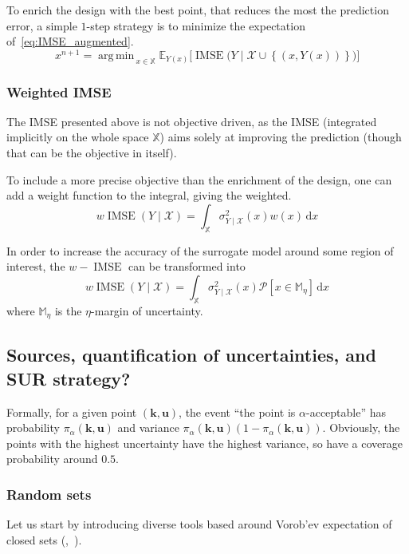 \documentclass[a4paper,11pt]{article}
\newcommand{\Ex}{\mathbb{E}}
\newcommand{\ProbGP}{\mathcal{P}}
\newcommand{\Xspace}{\mathbb{X}}
\newcommand{\kk}{\mathbf{k}}
\newcommand{\uu}{\mathbf{u}}
\DeclareMathOperator*{\argmin}{arg\,min \,}
\DeclareMathOperator{\IMSE}{IMSE}
\theoremstyle{defi}
\numberwithin{thmCounter}{section}
\begin{document}
To enrich the design with the best point, that reduces the most the prediction error, a simple $1$-step strategy is to minimize the expectation of~\eqref{eq:IMSE_augmented}.
\begin{equation}
  x^{n+1} = \argmin_{x\in \Xspace}\Ex_{Y(x)}\Big[\IMSE\big(Y \mid \mathcal{X} \cup \left\{(x, Y(x))\right\} \big)\Big]
\end{equation}

\subsubsection{Weighted IMSE}
The IMSE presented above is not objective driven, as the IMSE (integrated implicitly on the whole space $\Xspace$) aims solely at improving the prediction (though that can be the objective in itself).

To include a more precise objective than the enrichment of the design, one can add a weight function to the integral, giving the weighted.
\begin{equation}
  \label{eq:w-imse}
  w\IMSE(Y\mid \mathcal{X}) = \int_{\Xspace} \sigma_{Y\mid\mathcal{X}}^2(x)w(x)\,\mathrm{d}x
\end{equation}

In order to increase the accuracy of the surrogate model around some region of interest, the $w-\IMSE$ can be transformed into
\begin{equation}
  w\IMSE(Y\mid \mathcal{X}) = \int_{\Xspace} \sigma_{Y\mid\mathcal{X}}^2(x)\ProbGP\left[x \in \mathbb{M}_{\eta}\right]\,\mathrm{d}x
\end{equation}
where $\mathbb{M}_{\eta}$ is the $\eta$-margin of uncertainty.



\subsection{Sources, quantification of uncertainties, and SUR strategy?}
Formally, for a given point $(\kk,\uu)$, the event ``the point is $\alpha$-acceptable'' has probability $\pi_{\alpha}(\kk,\uu)$ and variance $\pi_{\alpha}(\kk,\uu) (1-\pi_{\alpha}(\kk,\uu))$. Obviously, the points with the highest uncertainty have the highest variance, so have a coverage probability around $0.5$.

\subsubsection{Random sets}
Let us start by introducing diverse tools based around Vorob'ev expectation of closed sets (\cite{el_amri_analyse_2019},~\cite{heinrich_level_2012}). 
\end{document}
